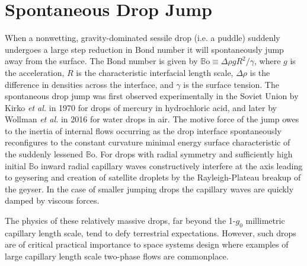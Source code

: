 \documentclass[aip,reprint, floatfix]{revtex4-1}
\begin{document}
\pacs{}%

\maketitle %

\section{Spontaneous Drop Jump}
When a nonwetting, gravity-dominated sessile drop (i.e. a puddle) suddenly undergoes a large step reduction in Bond number it will spontaneously jump away from the surface. The Bond number is given by $\mathbb{B}\mbox{o} \equiv \Delta \rho g R^2 / \gamma$, where $g$ is the acceleration, $R$ is the characteristic interfacial length scale, $\Delta \rho$ is the difference in densities across the interface, and $\gamma$ is the surface tension. The spontaneous drop jump was first observed experimentally in the Soviet Union by Kirko \emph{et al.} \cite{kirko_phenomenon_1970} in 1970 for drops of mercury in hydrochloric acid, and later by Wollman \emph{et al.} \cite{wollman_more_2016} in 2016 for water drops in air. The motive force of the jump owes to the inertia of internal flows occurring as the drop interface spontaneously reconfigures to the constant curvature minimal energy surface characteristic of the suddenly lessened $\mathbb{B}\mbox{o}$. For drops with radial symmetry and sufficiently high initial $\mathbb{B}\mbox{o}$ inward radial capillary waves constructively interfere at the axis leading to geysering and creation of satellite droplets by the Rayleigh-Plateau breakup of the geyser. In the case of smaller jumping drops the capillary waves are quickly damped by viscous forces.

The physics of these relatively massive drops, far beyond the 1-$g_0$ millimetric capillary length scale, tend to defy terrestrial expectations. However, such drops are of critical practical importance to space systems design where examples of large capillary length scale two-phase flows are commonplace.
\end{document}
